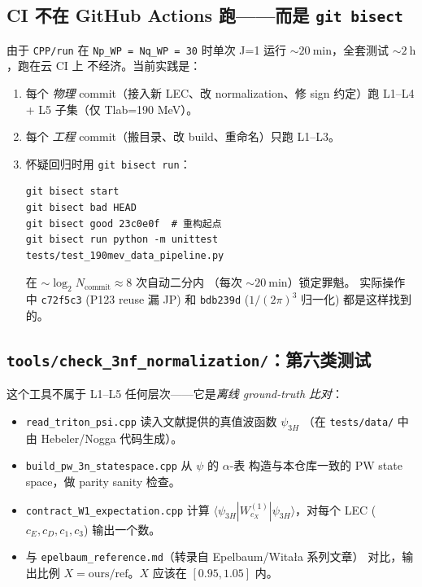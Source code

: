 \subsection{CI 不在 GitHub Actions 跑——而是 \texttt{git bisect}}

由于 \texttt{CPP/run} 在 \texttt{Np\_WP = Nq\_WP = 30} 时单次 J=1 运行
${\sim}\SI{20}{\minute}$，全套测试 ${\sim}\SI{2}{\hour}$，跑在云 CI 上
不经济。当前实践是：

\begin{enumerate}
\item 每个 \emph{物理} commit（接入新 LEC、改 normalization、修
      sign 约定）跑 L1--L4 + L5 子集（仅 Tlab=190 MeV）。
\item 每个 \emph{工程} commit（搬目录、改 build、重命名）只跑 L1--L3。
\item 怀疑回归时用 \texttt{git bisect run}：
\begin{lstlisting}[style=config,numbers=none]
git bisect start
git bisect bad HEAD
git bisect good 23c0e0f  # 重构起点
git bisect run python -m unittest tests/test_190mev_data_pipeline.py
\end{lstlisting}
      在 ${\sim}{\log_2 N_{\text{commit}}} \approx 8$ 次自动二分内
      （每次 ${\sim}\SI{20}{\minute}$）锁定罪魁。 实际操作中
      \texttt{c72f5c3} (P123 reuse 漏 JP) 和 \texttt{bdb239d}
      ($1/(2\pi)^3$ 归一化) 都是这样找到的。
\end{enumerate}

\subsection{\texttt{tools/check\_3nf\_normalization/}：第六类测试}

这个工具不属于 L1--L5 任何层次——它是\emph{离线 ground-truth 比对}：

\begin{itemize}
\item \texttt{read\_triton\_psi.cpp} 读入文献提供的真值波函数 $\psi_{3H}$
      （在 \texttt{tests/data/} 中由 Hebeler/Nogga 代码生成）。
\item \texttt{build\_pw\_3n\_statespace.cpp} 从 $\psi$ 的 $\alpha$-表
      构造与本仓库一致的 PW state space，做 parity sanity 检查。
\item \texttt{contract\_W1\_expectation.cpp} 计算
      $\langle\psi_{3H}|W^{(1)}_{c_X}|\psi_{3H}\rangle$，对每个 LEC
      ($c_E, c_D, c_1, c_3$) 输出一个数。
\item 与 \texttt{epelbaum\_reference.md}（转录自 Epelbaum/Witała 系列文章）
      对比，输出比例 $X = \text{ours}/\text{ref}$。$X$ 应该在 $[0.95, 1.05]$ 内。
\end{itemize}

